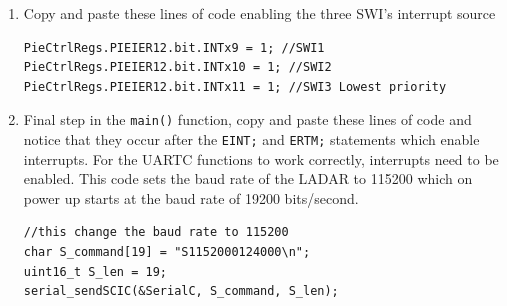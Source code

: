 \documentclass[11pt]{article}
\begin{document}
\begin{enumerate}
\begin{verbatim}
for (LADARi = 0; LADARi < 228; LADARi++) {
   //0.017453292519943 is pi/180
   ladar_data[LADARi].angle = ((3*LADARi+44)*0.3515625-135)*0.01745329;
}
\end{verbatim}
        \item Copy and paste these lines of code enabling the three SWI’s interrupt source
\begin{verbatim}
PieCtrlRegs.PIEIER12.bit.INTx9 = 1; //SWI1
PieCtrlRegs.PIEIER12.bit.INTx10 = 1; //SWI2
PieCtrlRegs.PIEIER12.bit.INTx11 = 1; //SWI3 Lowest priority
\end{verbatim}
            \item Final step in the \texttt{main()} function, copy and paste these lines of code and notice that they occur after the \texttt{EINT;} and \texttt{ERTM;} statements which enable interrupts. For the UARTC functions to work correctly, interrupts need to be enabled. This code sets the baud rate of the LADAR to 115200 which on power up starts at the baud rate of 19200 bits/second.
\begin{verbatim}
//this change the baud rate to 115200
char S_command[19] = "S1152000124000\n";
uint16_t S_len = 19;
serial_sendSCIC(&SerialC, S_command, S_len);


\end{verbatim}
\end{enumerate}
\end{document}
